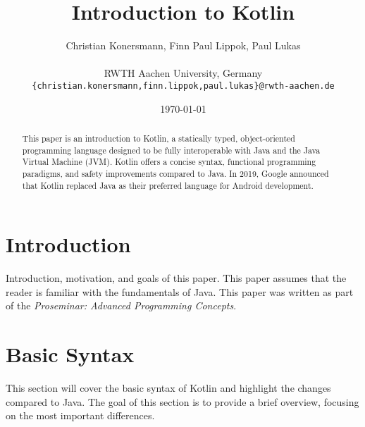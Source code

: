 \documentclass[a4paper, 11pt]{article}
\title{\huge \bfseries Introduction to Kotlin}
\author{
  Christian Konersmann, Finn Paul Lippok, Paul Lukas \\ 
  \\
  RWTH Aachen University, Germany \\
  \texttt{\{christian.konersmann,finn.lippok,paul.lukas\}@rwth-aachen.de}
}
\date{\today}
\begin{document}
\maketitle

\begin{abstract}
  This paper is an introduction to Kotlin, a statically typed, object-oriented programming language designed to be fully interoperable with Java and the Java Virtual Machine (JVM).
  Kotlin offers a concise syntax, functional programming paradigms, and safety improvements compared to Java. In 2019, Google announced that Kotlin replaced Java as their preferred language for Android development.
\end{abstract}

\section{Introduction}
  Introduction, motivation, and goals of this paper.
  This paper assumes that the reader is familiar with the fundamentals of Java.
  This paper was written as part of the \textit{Proseminar: Advanced Programming Concepts}.
\section{Basic Syntax}
  This section will cover the basic syntax of Kotlin and highlight the changes compared to Java.
  The goal of this section is to provide a brief overview, focusing on the most important differences.
\end{document}
